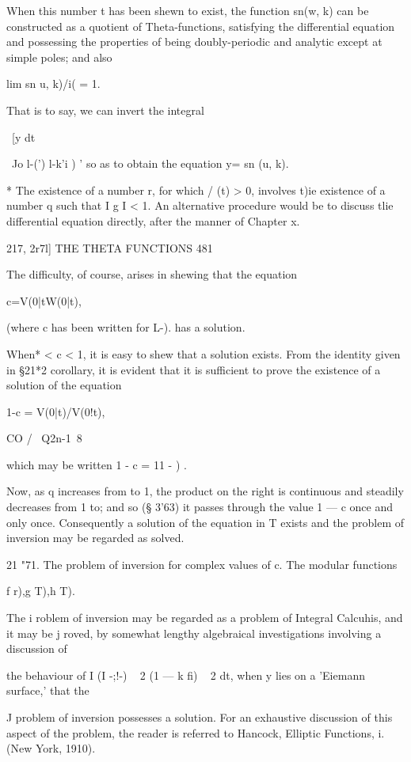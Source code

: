 When this number t has been shewn to exist, the function sn(w, k) can
be constructed as a quotient of Theta-functions, satisfying the
differential equation and possessing the properties of being
doubly-periodic and analytic except at simple poles; and also

lim sn u, k)/i( = 1.

That is to say, we can invert the integral

\ [y dt

 ~Jo l-(') l-k'i ) ' so as to obtain the equation y= sn (u, k).

* The existence of a number r, for which / (t) > 0, involves t)ie
existence of a number q such that I g I < 1. An alternative procedure
would be to discuss tlie differential equation directly, after the
manner of Chapter x.

217, 2r7l] THE THETA FUNCTIONS 481

The difficulty, of course, arises in shewing that the equation

c=V(0|tW(0|t),

(where c has been written for L-). has a solution.

When* < c < 1, it is easy to shew that a solution exists. From the
identity given in §21*2 corollary, it is evident that it is sufficient
to prove the existence of a solution of the equation

1-c = V(0|t)/V(0!t),

CO / \ Q2n-1\ 8

which may be written 1 - c = 11 - ) .

Now, as q increases from to 1, the product on the right is continuous
and steadily decreases from 1 to; and so (§ 3'63) it passes through
the value 1 — c once and only once. Consequently a solution of the
equation in T exists and the problem of inversion may be regarded as
solved.

21 "71. The problem of inversion for complex values of c. The modular
functions

f r),g T),h T).

The i roblem of inversion may be regarded as a problem of Integral
Calcuhis, and it may be j roved, by somewhat lengthy algebraical
investigations involving a discussion of

the behaviour of I (I -;!-) ~ 2 (1 — k fi) ~ 2 dt, when y lies on a
'Eiemann surface,' that the

J problem of inversion possesses a solution. For an exhaustive
discussion of this aspect of the problem, the reader is referred to
Hancock, Elliptic Functions, i. (New York, 1910).

